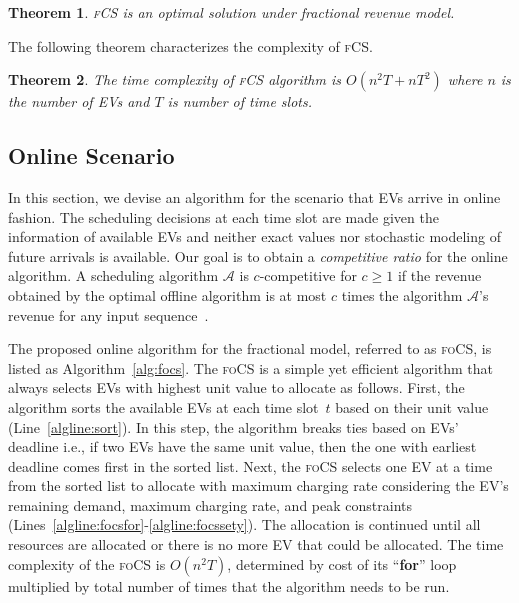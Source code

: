 \documentclass[journal]{IEEEtran}
\newcommand{\revv}[1]{{\color{black}#1}}%
\newcommand{\fcs}{\textsc{fCS}\xspace}
\newcommand{\focs}{\textsc{foCS}\xspace}
\newtheorem{thm}{Theorem}
\begin{document}
{\begin{thm}
	\label{cor:1}
	\fcs is an optimal solution under fractional revenue model.
\end{thm}

The following theorem characterizes the complexity of \fcs.

\begin{thm}
	\label{thm:complexity}
	The time complexity of \fcs algorithm is $O(n^2T+nT^2)$ where $n$ is the number of EVs and $T$ is number of time slots.
\end{thm}
}

\vspace{-4mm}
\subsection{Online Scenario}
\label{sec:fonline}
In this section, we devise an algorithm for the scenario that EVs arrive in online fashion. The scheduling decisions at each time slot are made given the information of available EVs and neither exact values nor stochastic modeling of future arrivals is available. Our goal is to obtain a \emph{competitive ratio} for the online algorithm. A scheduling algorithm $\mathcal{A}$ is $c$-competitive for $c\geq 1$ if the revenue obtained by the optimal offline algorithm is at most $c$ times the algorithm $\mathcal{A}$'s revenue for any input sequence~\cite{borodin2005online}.

The proposed online algorithm for the fractional model, referred to as \focs, is listed as Algorithm~\ref{alg:focs}. The \focs is a simple yet efficient algorithm that always selects EVs with highest unit value to allocate as follows. First, the algorithm sorts the available EVs at each time slot~$t$ based on their unit value (Line~\ref{algline:sort}). \revv{In this step, the algorithm breaks ties based on EVs' deadline i.e., if two EVs have the same unit value, then the one with earliest deadline comes first in the sorted list.} Next, the \focs selects one EV at a time from the sorted list to allocate with maximum charging rate considering the EV's remaining demand, maximum charging rate, and peak constraints (Lines~\ref{algline:focsfor}-\ref{algline:focssety}). The allocation is continued until all resources are allocated or there is no more EV that could be allocated. 
The time complexity of the \focs is $O(n^2T)$, determined by cost of its ``\textbf{for}'' loop multiplied by total number of times that the algorithm needs to be run.
\end{document}
